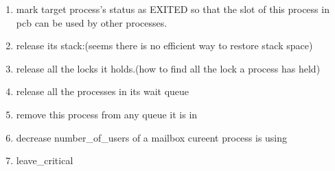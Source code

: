 \documentclass{article}
\begin{document}
\begin{enumerate}
\begin{enumerate}
  \item mark target process's status as EXITED so that the slot of this process in pcb can be used by other processes.
  \item release its stack:(seems there is no efficient way to restore stack space)
  \item release all the locks it holds.(how to find all the lock a process has held)
  \item release all the processes in its wait queue
  \item remove this process from any queue it is in
  \item decrease number\_of\_users of a mailbox cureent process is using
  \item leave\_critical
  \end{enumerate}
\end{enumerate}
\end{document}
